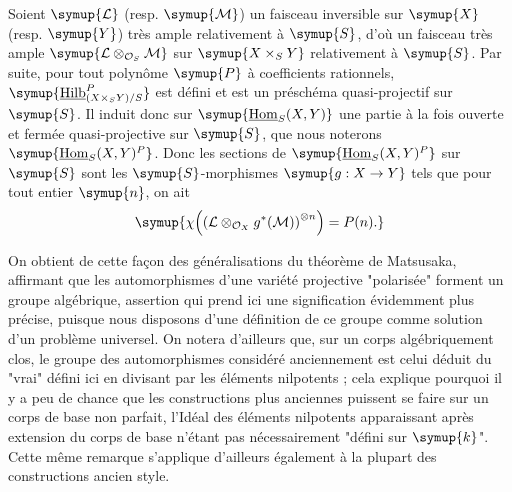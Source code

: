 Soient $\symup{\mathcal L}$ (resp. $\symup{\mathcal M}$) un faisceau inversible sur $\symup{X}$ (resp.
$\symup{Y}$) très ample relativement à $\symup{S}$, d'où un faisceau très ample
$\symup{\mathcal L\otimes_{\mathcal O_S}\mathcal M}$ sur $\symup{X\times_SY}$ relativement à
$\symup{S}$. Par suite, pour tout polynôme $\symup{P}$ à coefficients rationnels,
$\symup{\underline{\operatorname{Hilb}}^P_{(X\times_SY)/S}}$ est défini et est un préschéma
quasi-projectif sur $\symup{S}$. Il induit donc sur $\symup{\underline{\operatorname{Hom}}_S(X,Y)}$ une
partie à la fois ouverte et fermée quasi-projective sur $\symup{S}$, que nous noterons
$\symup{\underline{\operatorname{Hom}}_S(X,Y)^P}$. Donc les sections de
$\symup{\underline{\operatorname{Hom}}_S(X,Y)^P}$ sur $\symup{S}$ sont les $\symup{S}$-morphismes
$\symup{g:X\to Y}$ tels que pour tout entier $\symup{n}$, on ait
\[
\symup{\chi\!\left(\left(\mathcal L\otimes_{\mathcal O_X}g^*(\mathcal M)\right)^{
\otimes n}\right)=P(n).}
\]

On obtient de cette façon des généralisations du théorème de Matsusaka,
affirmant que les automorphismes d'une variété projective "polarisée" forment
un groupe algébrique, assertion qui prend ici une signification évidemment plus
précise, puisque nous disposons d'une définition de ce groupe comme solution
d'un problème universel. On notera d'ailleurs que, sur un corps algébriquement
clos, le groupe des automorphismes considéré anciennement est celui déduit du
"vrai" défini ici en divisant par les éléments nilpotents ; cela explique
pourquoi il y a peu de chance que les constructions plus anciennes puissent se
faire sur un corps de base non parfait, l'Idéal des éléments nilpotents
apparaissant après extension du corps de base n'étant pas nécessairement
"défini sur $\symup{k}$". Cette même remarque s'applique d'ailleurs également à la
plupart des constructions ancien style.


